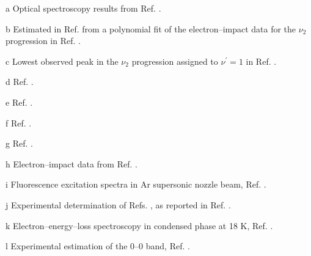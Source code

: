\begin{center}
\begin{threeparttable}
\begin{tablenotes}
\item[a] Optical spectroscopy results from Ref. .
\item[b] Estimated in Ref.  from a polynomial fit of the electron--impact data for the
$\nu_2$ progression in Ref. .
\item[c] Lowest observed peak in the $\nu_2$ progression assigned to $\nu^\prime=1$
in Ref. .
\item[d] Ref. .
\item[e] Ref. .
\item[f] Ref. .
\item[g] Ref. .
\item[h] Electron--impact data from Ref. .
\item[i] Fluorescence excitation spectra in Ar supersonic nozzle beam, Ref.
.
\item[j] Experimental determination of Refs. ,
as reported in Ref. .
\item[k] Electron--energy--loss spectroscopy in condensed phase at 18 K, Ref.
.
\item[l] Experimental estimation of the 0--0 band, Ref. .
\end{tablenotes}
\end{threeparttable}
\end{center}
